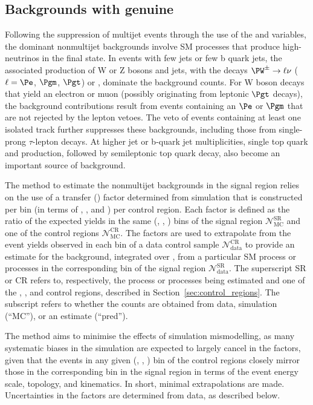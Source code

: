 \subsection{Backgrounds with genuine \texorpdfstring{\ETmiss}{MET}}
\label{sec:ewk_background}

Following the suppression of multijet events through the use of the
\alphat and \bdphi variables, the dominant nonmultijet backgrounds
involve SM processes that produce high-\pt neutrinos in the final
state. In events with few jets or few b quark jets, the associated
production of W or Z bosons and jets, with the decays $\PW^\pm
\to \ell\nu$ ($\ell=\Pe$, $\Pgm$, $\Pgt$) or \znunu,
dominate the background counts. For W boson decays that yield an
electron or muon (possibly originating from leptonic $\Pgt$ decays),
the background contributions result from events containing an $\Pe$ or
$\Pgm$ that are not rejected by the lepton vetoes.
The veto of events containing at least one isolated track further
suppresses these backgrounds, including those from single-prong
$\tau$-lepton decays. At higher jet or b-quark jet multiplicities,
single top quark and \ttbar production, followed by semileptonic top
quark decay, also become an important source of background.

The method to estimate the nonmultijet backgrounds in the signal
region relies on the use of a transfer (\tf) factor determined from
simulation that is constructed per bin (in terms of \njet, \nb, and
\scalht) per control region. Each \tf factor is defined as the ratio
of the expected yields in the same (\njet, \nb, \scalht) bins of the
signal region $\mathcal{N}^\text{SR}_\text{MC}$ and one of the control
regions $\mathcal{N}^\text{CR}_\text{MC}$.  The \tf factors are used to
extrapolate from the event yields observed in each bin of a data
control sample $\mathcal{N}^\text{CR}_\text{data}$ to provide an
estimate for the background, integrated over \HTmiss, from a
particular SM process or processes in the corresponding bin of the
signal region $\mathcal{N}^\text{SR}_\text{data}$.  The superscript SR
or CR refers to, respectively, the process or processes being
estimated and one of the \mj, \mmj, and \gj control regions, described
in Section~\ref{sec:control_regions}. The subscript refers to whether
the counts are obtained from data, simulation (``MC''), or an estimate
(``pred'').

The method aims to minimise the effects of simulation mismodelling, as
many systematic biases in the simulation are expected to largely
cancel in the \tf factors, given that the events in any given (\njet,
\nb, \scalht) bin of the control regions closely mirror those in the
corresponding bin in the signal region in terms of the event energy
scale, topology, and kinematics. In short, minimal extrapolations are
made. Uncertainties in the \tf factors are determined from data, as
described below.


